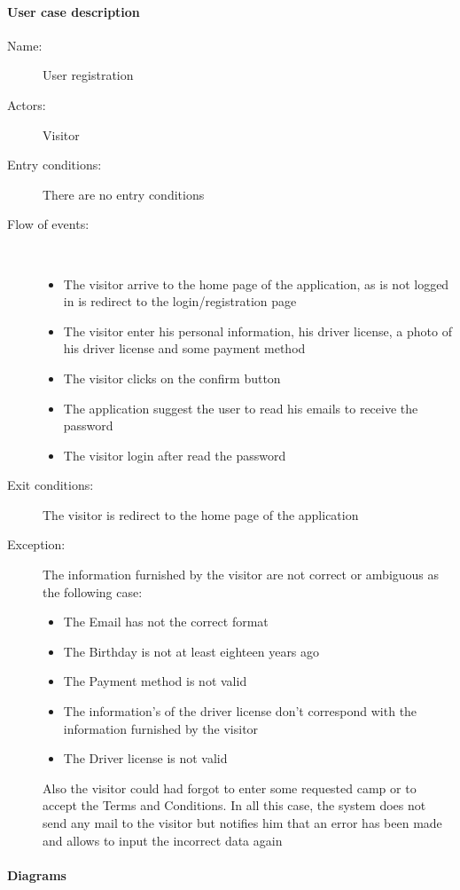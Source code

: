 \paragraph{User case description}
\begin{description}
	\item[Name:] User registration
	\item[Actors:] Visitor
	\item[Entry conditions:] There are no entry conditions
	\item[Flow of events:]  \ \\
		\begin{itemize}
			\item The visitor arrive to the home page of the application, as is not logged in is redirect to the login/registration page
			\item The visitor enter his personal information, his driver license, a photo of his driver license and some payment method
			\item The visitor clicks on the confirm button
			\item The application suggest the user to read his emails to receive the password
			\item The visitor login after read the password
		\end{itemize}
	\item[Exit conditions:] The visitor is redirect to the home page of the application
	\item [Exception:] The information furnished by the visitor are not correct or ambiguous as the following case:
		\begin{itemize}
			\item The Email has not the correct format
			\item The Birthday is not at least eighteen years ago
			\item The Payment method is not valid
			\item The information's of the driver license don't correspond with the information furnished by the visitor
			\item The Driver license is not valid
		\end {itemize}
		Also the visitor could had forgot to enter some requested camp or to accept the Terms and Conditions. In all this case, the system does not send any mail to the visitor but notifies him that an error has been made and allows to input the incorrect data again
	\end{description}
\paragraph{Diagrams}

